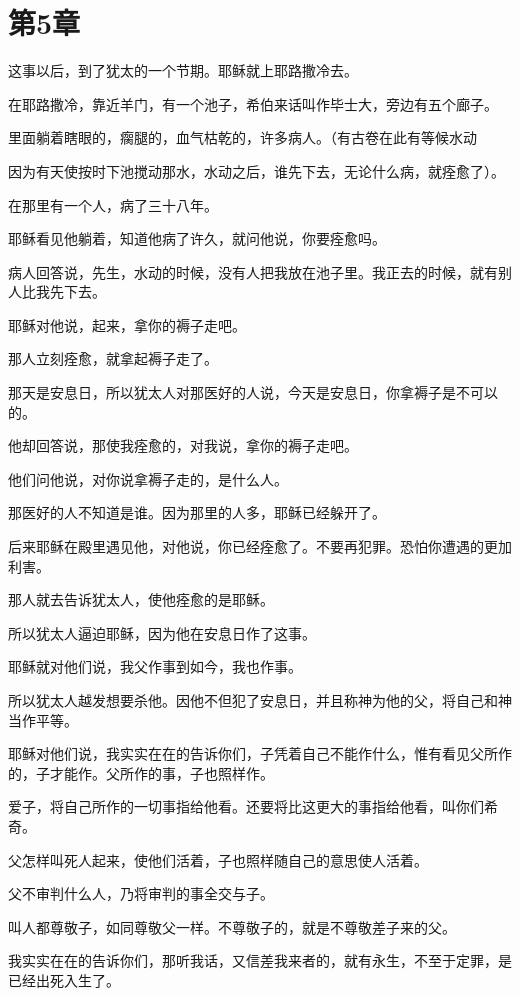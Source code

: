 \documentclass[12pt,oneside]{book}
\begin{document}
\chapter{第5章}
这事以后，到了犹太的一个节期。耶稣就上耶路撒冷去。

在耶路撒冷，靠近羊门，有一个池子，希伯来话叫作毕士大，旁边有五个廊子。

里面躺着瞎眼的，瘸腿的，血气枯乾的，许多病人。（有古卷在此有等候水动

因为有天使按时下池搅动那水，水动之后，谁先下去，无论什么病，就痊愈了）。

在那里有一个人，病了三十八年。

耶稣看见他躺着，知道他病了许久，就问他说，你要痊愈吗。

病人回答说，先生，水动的时候，没有人把我放在池子里。我正去的时候，就有别人比我先下去。

耶稣对他说，起来，拿你的褥子走吧。

那人立刻痊愈，就拿起褥子走了。

那天是安息日，所以犹太人对那医好的人说，今天是安息日，你拿褥子是不可以的。

他却回答说，那使我痊愈的，对我说，拿你的褥子走吧。

他们问他说，对你说拿褥子走的，是什么人。

那医好的人不知道是谁。因为那里的人多，耶稣已经躲开了。

后来耶稣在殿里遇见他，对他说，你已经痊愈了。不要再犯罪。恐怕你遭遇的更加利害。

那人就去告诉犹太人，使他痊愈的是耶稣。

所以犹太人逼迫耶稣，因为他在安息日作了这事。

耶稣就对他们说，我父作事到如今，我也作事。

所以犹太人越发想要杀他。因他不但犯了安息日，并且称神为他的父，将自己和神当作平等。

耶稣对他们说，我实实在在的告诉你们，子凭着自己不能作什么，惟有看见父所作的，子才能作。父所作的事，子也照样作。

爱子，将自己所作的一切事指给他看。还要将比这更大的事指给他看，叫你们希奇。

父怎样叫死人起来，使他们活着，子也照样随自己的意思使人活着。

父不审判什么人，乃将审判的事全交与子。

叫人都尊敬子，如同尊敬父一样。不尊敬子的，就是不尊敬差子来的父。

我实实在在的告诉你们，那听我话，又信差我来者的，就有永生，不至于定罪，是已经出死入生了。
\end{document}
